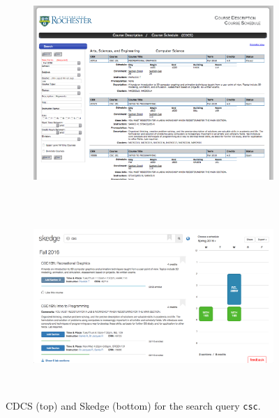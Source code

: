 \begin{figure}[ht]
    \centering
        \begin{subfigure}[h]{14cm}
            \centering
            \includegraphics[width=1.00\textwidth]{images/cdcs}
        \end{subfigure}\\
        \vspace{20pt}\\
        \begin{subfigure}[h]{15cm}
            \centering
            \includegraphics[width=1.00\textwidth]{images/skedge}
        \end{subfigure}
        \vspace{20pt}\\
    \caption{CDCS (top) and Skedge (bottom) for the search query {\tt csc}.}
\end{figure}

